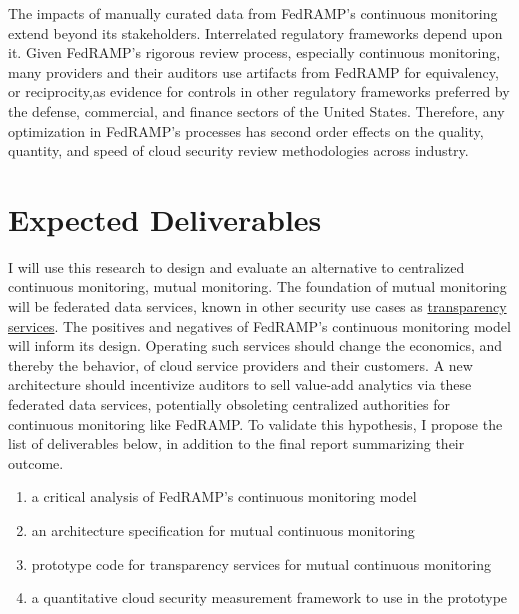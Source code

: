 \documentclass{jdf}
\begin{document}
The impacts of manually curated data from FedRAMP's continuous monitoring extend beyond its stakeholders. Interrelated regulatory frameworks depend upon it. Given FedRAMP's rigorous review process, especially continuous monitoring, many providers and their auditors use artifacts from FedRAMP for equivalency, or reciprocity,as evidence for controls in other regulatory frameworks preferred by the defense, commercial, and finance sectors of the United States. Therefore, any optimization in FedRAMP's processes has second order effects on the quality, quantity, and speed of cloud security review methodologies across industry.

\section{Expected Deliverables}

I will use this research to design and evaluate an alternative to centralized continuous monitoring, mutual monitoring. The foundation of mutual monitoring will be federated data services, known in other security use cases as \hyperlink{https://transparency.dev}{transparency services}. The positives and negatives of FedRAMP's continuous monitoring model will inform its design. Operating such services should change the economics, and thereby the behavior, of cloud service providers and their customers. A new architecture should incentivize auditors to sell value-add analytics via these federated data services, potentially obsoleting centralized authorities for continuous monitoring like FedRAMP. To validate this hypothesis, I propose the list of deliverables below, in addition to the final report summarizing their outcome. 

\begin{enumerate}
    \item a critical analysis of FedRAMP's continuous monitoring model
    \item an architecture specification for mutual continuous monitoring
    \item prototype code for transparency services for mutual continuous monitoring
    \item a quantitative cloud security measurement framework to use in the prototype
\end{enumerate}



\end{document}
